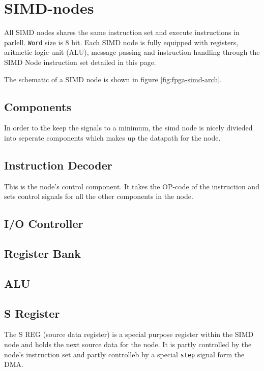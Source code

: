 \section{SIMD-nodes}

All SIMD nodes shares the same instruction set and execute instructions in
parlell. {\tt Word} size is 8 bit. Each SIMD node is fully equipped with
registers, aritmetic logic unit (ALU), message passing and instruction handling
through the SIMD Node instruction set detailed in this page.

The schematic of a SIMD node is shown in figure
\ref{fig:fpga-simd-arch}. 



\subsection{Components}
In order to the keep the signals to a minimum, the simd node is nicely divieded
into seperate components which makes up the datapath for the node.

\subsection{Instruction Decoder}
This is the node's control component. It takes the OP-code of the instruction
and sets control signals for all the other components in the node.

\subsection{I/O Controller}

\subsection{Register Bank}

\subsection{ALU}

\subsection{S Register}
The S REG (source data register) is a special purpose register within the SIMD
node and holds the next source data for the node. It is partly controlled by the
node's instruction set and partly controlleb by a special {\tt step} signal form
the DMA.

